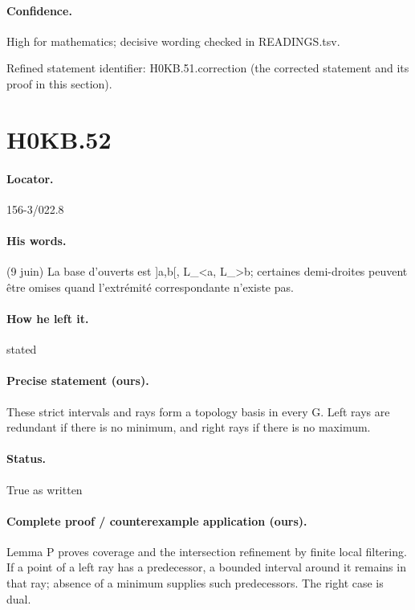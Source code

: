 \paragraph{Confidence.} High for mathematics; decisive wording checked in READINGS.tsv.

\noindent Refined statement identifier: H0KB.51.correction (the corrected statement and its proof in this section).

\section*{H0KB.52}\label{statement:H0KB.52}
\paragraph{Locator.} 156-3/022.8

\paragraph{His words.} (9 juin) La base d’ouverts est ]a,b[, L\_<a, L\_>b; certaines demi-droites peuvent être omises quand l’extrémité correspondante n’existe pas.

\paragraph{How he left it.} stated

\paragraph{Precise statement (ours).} These strict intervals and rays form a topology basis in every G. Left rays are redundant if there is no minimum, and right rays if there is no maximum.

\paragraph{Status.} True as written

\paragraph{Complete proof / counterexample application (ours).} Lemma P proves coverage and the intersection refinement by finite local filtering. If a point of a left ray has a predecessor, a bounded interval around it remains in that ray; absence of a minimum supplies such predecessors. The right case is dual.

